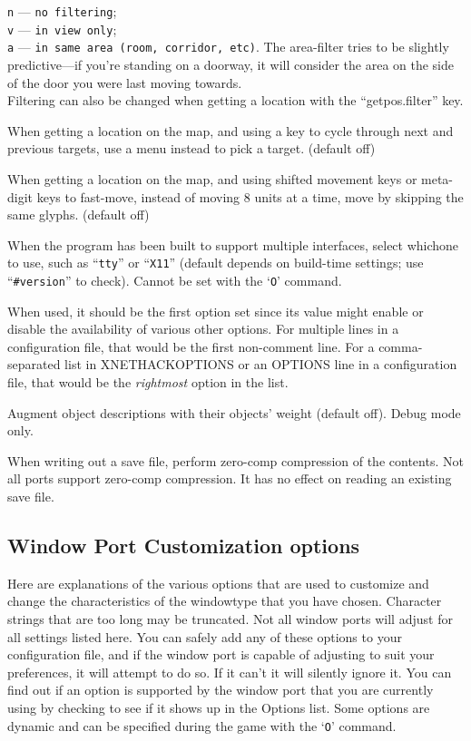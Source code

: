 \documentclass[titlepage]{article}
\begin{document}
\begin{description}[font=\mdseries\itshape]
\texttt{n} --- \texttt{no filtering};\\
\texttt{v} --- \texttt{in view only};\\
\texttt{a} --- \texttt{in same area (room, corridor, etc)}.
The area-filter tries to be slightly
predictive---if
you're standing on a doorway, it will consider the area on the side of
the door you were last moving towards.\\
Filtering can also be changed when getting a location with
the ``getpos.filter'' key.
\item[whatis\textunderscore menu]
When getting a location on the map, and using a key to cycle through
next and previous targets, use a menu instead to pick a target.
(default off)
\item[whatis\textunderscore moveskip]
When getting a location on the map, and using shifted movement keys or
meta-digit keys to fast-move, instead of moving 8 units at a time,
move by skipping the same glyphs.
(default off)
\item[windowtype]
When the program has been built to support multiple interfaces,
select whichone to use, such as ``\texttt{tty}'' or ``\texttt{X11}''
(default depends on build-time settings; use ``\texttt{\#version}'' to check).
Cannot be set with the `\texttt{O}' command.

When used, it should be the first option set since its value might
enable or disable the availability of various other options.
For multiple lines in a configuration file, that would be the first
non-comment line.
For a comma-separated list in XNETHACKOPTIONS or an OPTIONS line in a
configuration file, that would be the \textit{rightmost} option in the list.
\item[wizweight]
Augment object descriptions with their objects' weight (default off).
Debug mode only.
\item[zerocomp]
When writing out a save file, perform zero-comp compression of the
contents. Not all ports support zero-comp compression. It has no effect
on reading an existing save file.
\end{description}

\subsection*{Window Port Customization options}

Here are explanations of the various options that are
used to customize and change the characteristics of the
windowtype that you have chosen.
Character strings that are too long may be truncated.
Not all window ports will adjust for all settings listed
here.  You can safely add any of these options to your
configuration file, and if the window port is capable of adjusting
to suit your preferences, it will attempt to do so. If it
can't it will silently ignore it.  You can find out if an
option is supported by the window port that you are currently
using by checking to see if it shows up in the Options list.
Some options are dynamic and can be specified during the game
with the `\texttt{O}' command.
\end{document}
